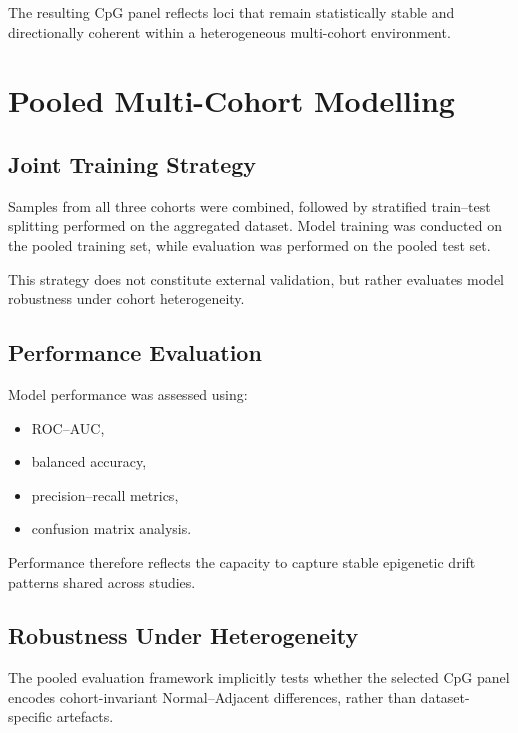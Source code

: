 The resulting CpG panel reflects loci that remain
statistically stable and directionally coherent
within a heterogeneous multi-cohort environment.

\section{Pooled Multi-Cohort Modelling}

\subsection{Joint Training Strategy}

Samples from all three cohorts were combined,
followed by stratified train–test splitting
performed on the aggregated dataset.
Model training was conducted on the pooled training set,
while evaluation was performed on the pooled test set.

This strategy does not constitute external validation,
but rather evaluates model robustness
under cohort heterogeneity.

\subsection{Performance Evaluation}

Model performance was assessed using:

\begin{itemize}
\item ROC–AUC,
\item balanced accuracy,
\item precision–recall metrics,
\item confusion matrix analysis.
\end{itemize}

Performance therefore reflects the capacity to capture
stable epigenetic drift patterns
shared across studies.

\subsection{Robustness Under Heterogeneity}

The pooled evaluation framework implicitly tests whether
the selected CpG panel encodes cohort-invariant
Normal–Adjacent differences,
rather than dataset-specific artefacts.

